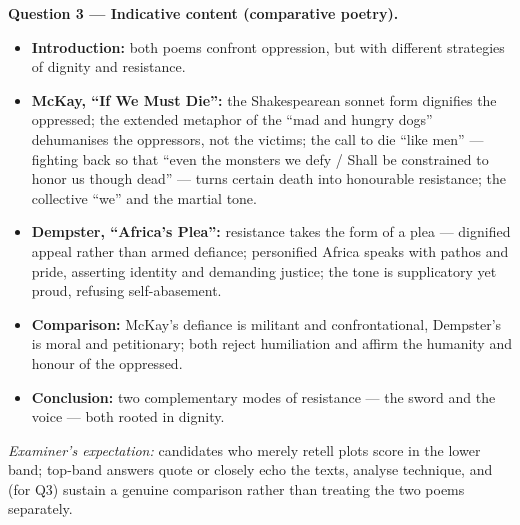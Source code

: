 \documentclass[11pt]{article}
\begin{document}
\begin{corrige}
\textbf{Question 3 — Indicative content (comparative poetry).}
\begin{itemize}
\item \textbf{Introduction:} both poems confront oppression, but with different strategies of dignity and resistance.
\item \textbf{McKay, ``If We Must Die'':} the Shakespearean sonnet form dignifies the oppressed; the extended metaphor of the ``mad and hungry dogs'' dehumanises the oppressors, not the victims; the call to die ``like men'' — fighting back so that ``even the monsters we defy / Shall be constrained to honor us though dead'' — turns certain death into honourable resistance; the collective ``we'' and the martial tone.
\item \textbf{Dempster, ``Africa's Plea'':} resistance takes the form of a plea — dignified appeal rather than armed defiance; personified Africa speaks with pathos and pride, asserting identity and demanding justice; the tone is supplicatory yet proud, refusing self-abasement.
\item \textbf{Comparison:} McKay's defiance is militant and confrontational, Dempster's is moral and petitionary; both reject humiliation and affirm the humanity and honour of the oppressed.
\item \textbf{Conclusion:} two complementary modes of resistance — the sword and the voice — both rooted in dignity.
\end{itemize}
\emph{Examiner's expectation:} candidates who merely retell plots score in the lower band; top-band answers quote or closely echo the texts, analyse technique, and (for Q3) sustain a genuine comparison rather than treating the two poems separately.
\end{corrige}
\end{document}
